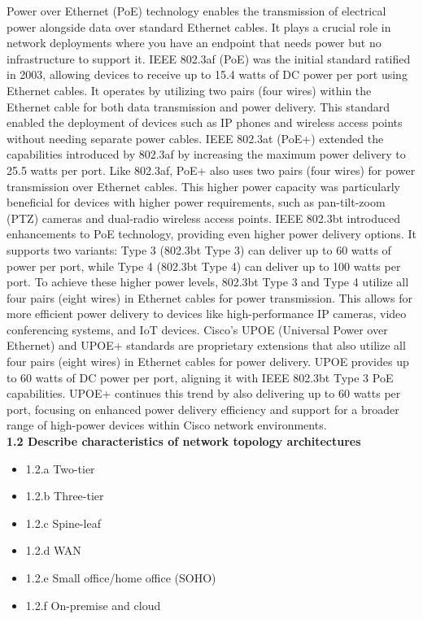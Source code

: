 \documentclass{article}
\begin{document}
	Power over Ethernet (PoE) technology enables the transmission of electrical power alongside data over standard Ethernet cables. It plays a crucial role in network deployments where you have an endpoint that needs power but no infrastructure to support it. IEEE 802.3af (PoE) was the initial standard ratified in 2003, allowing devices to receive up to 15.4 watts of DC power per port using Ethernet cables. It operates by utilizing two pairs (four wires) within the Ethernet cable for both data transmission and power delivery. This standard enabled the deployment of devices such as IP phones and wireless access points without needing separate power cables. IEEE 802.3at (PoE+) extended the capabilities introduced by 802.3af by increasing the maximum power delivery to 25.5 watts per port. Like 802.3af, PoE+ also uses two pairs (four wires) for power transmission over Ethernet cables. This higher power capacity was particularly beneficial for devices with higher power requirements, such as pan-tilt-zoom (PTZ) cameras and dual-radio wireless access points. IEEE 802.3bt introduced enhancements to PoE technology, providing even higher power delivery options. It supports two variants: Type 3 (802.3bt Type 3) can deliver up to 60 watts of power per port, while Type 4 (802.3bt Type 4) can deliver up to 100 watts per port. To achieve these higher power levels, 802.3bt Type 3 and Type 4 utilize all four pairs (eight wires) in Ethernet cables for power transmission. This allows for more efficient power delivery to devices like high-performance IP cameras, video conferencing systems, and IoT devices. Cisco's UPOE (Universal Power over Ethernet) and UPOE+ standards are proprietary extensions that also utilize all four pairs (eight wires) in Ethernet cables for power delivery. UPOE provides up to 60 watts of DC power per port, aligning it with IEEE 802.3bt Type 3 PoE capabilities. UPOE+ continues this trend by also delivering up to 60 watts per port, focusing on enhanced power delivery efficiency and support for a broader range of high-power devices within Cisco network environments.\\
  

\noindent\textbf{1.2 Describe characteristics of network topology architectures}
\begin{itemize}
\item 1.2.a Two-tier
\item 1.2.b Three-tier
\item 1.2.c Spine-leaf
\item 1.2.d WAN
\item 1.2.e Small office/home office (SOHO)
\item 1.2.f On-premise and cloud
\end{itemize}
  
\end{document}
